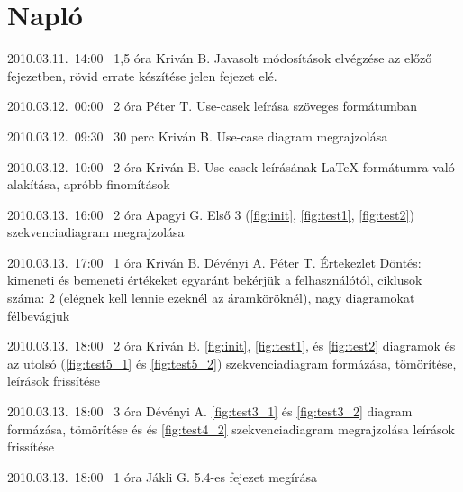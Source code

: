 %
\section{Napló}

\begin{naplo}

\bejegyzes
{2010.03.11.~14:00~}
{1,5 óra}
{Kriván B.}
{Javasolt módosítások elvégzése az előző fejezetben, rövid errate készítése jelen fejezet elé.}

\bejegyzes
{2010.03.12.~00:00~}
{2 óra}
{Péter T.}
{Use-casek leírása szöveges formátumban}

\bejegyzes
{2010.03.12.~09:30~}
{30 perc}
{Kriván B.}
{Use-case diagram megrajzolása}

\bejegyzes
{2010.03.12.~10:00~}
{2 óra}
{Kriván B.}
{Use-casek leírásának \LaTeX{} formátumra való alakítása, apróbb finomítások}

\bejegyzes
{2010.03.13.~16:00~}
{2 óra}
{Apagyi G.}
{Első 3 (\ref{fig:init}, \ref{fig:test1}, \ref{fig:test2}) szekvenciadiagram megrajzolása}

\bejegyzes
{2010.03.13.~17:00~}
{1 óra}
{Kriván B.\newline
Dévényi A.\newline
Péter T.}
{Értekezlet\newline
Döntés: kimeneti és bemeneti értékeket egyaránt bekérjük a felhasználótól, ciklusok száma: 2 (elégnek kell lennie ezeknél az áramköröknél), nagy diagramokat félbevágjuk}

\bejegyzes
{2010.03.13.~18:00~}
{2 óra}
{Kriván B.}
{\ref{fig:init}, \ref{fig:test1}, és \ref{fig:test2} diagramok és az utolsó (\ref{fig:test5_1} és \ref{fig:test5_2}) szekvenciadiagram formázása, tömörítése, leírások frissítése}

\bejegyzes
{2010.03.13.~18:00~}
{3 óra}
{Dévényi A.}
{\ref{fig:test3_1} és \ref{fig:test3_2} diagram formázása, tömörítése és  és \ref{fig:test4_2} szekvenciadiagram megrajzolása leírások frissítése}

\bejegyzes
{2010.03.13.~18:00~}
{1 óra}
{Jákli G.}
{5.4-es fejezet megírása}

\end{naplo}

